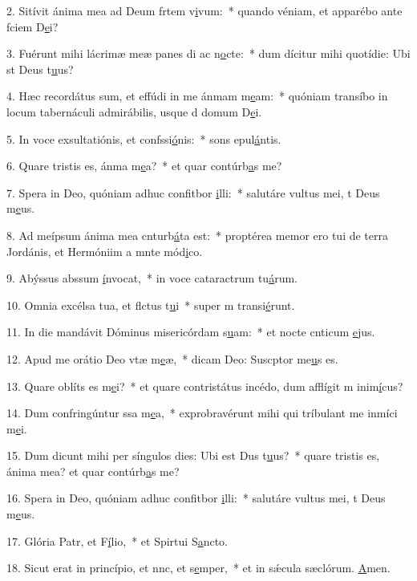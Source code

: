 2. Sitívit ánima mea ad Deum frtem v\uline{i}vum:~* quando véniam, et apparébo ante fciem D\uline{e}i?\par 
3. Fuérunt mihi lácrimæ meæ panes di ac n\uline{o}cte:~* dum dícitur mihi quotídie: Ubi st Deus t\uline{u}us?\par 
4. Hæc recordátus sum, et effúdi in me ánmam m\uline{e}am:~* quóniam transíbo in locum tabernáculi admirábilis, usque d domum D\uline{e}i.\par 
5. In voce exsultatiónis, et confssi\uline{ó}nis:~* sons epul\uline{á}ntis.\par 
6. Quare tristis es, ánma m\uline{e}a?~* et quar contúrb\uline{a}s me?\par 
7. Spera in Deo, quóniam adhuc confitbor \uline{i}lli:~* salutáre vultus mei, t Deus m\uline{e}us.\par 
8. Ad meípsum ánima mea cnturb\uline{á}ta est:~* proptérea memor ero tui de terra Jordánis, et Hermóniim a mnte mód\uline{i}co.\par 
9. Abýssus abssum \uline{í}nvocat,~* in voce cataractrum tu\uline{á}rum.\par 
10. Omnia excélsa tua, et flctus t\uline{u}i~* super m transi\uline{é}runt.\par 
11. In die mandávit Dóminus misericórdam s\uline{u}am:~* et nocte cnticum \uline{e}jus.\par 
12. Apud me orátio Deo vtæ m\uline{e}æ,~* dicam Deo: Suscptor me\uline{u}s es.\par 
13. Quare oblíts es m\uline{e}i?~* et quare contristátus incédo, dum afflígit m inim\uline{í}cus?\par 
14. Dum confringúntur ssa m\uline{e}a,~* exprobravérunt mihi qui tríbulant me inmíci m\uline{e}i.\par 
15. Dum dicunt mihi per síngulos dies: Ubi est Dus t\uline{u}us?~* quare tristis es, ánima mea? et quar contúrb\uline{a}s me?\par 
16. Spera in Deo, quóniam adhuc confitbor \uline{i}lli:~* salutáre vultus mei, t Deus m\uline{e}us.\par 
17. Glória Patr, et F\uline{í}lio,~* et Spirtui S\uline{a}ncto.\par 
18. Sicut erat in princípio, et nnc, et s\uline{e}mper,~* et in sǽcula sæclórum. \uline{A}men.\par 
